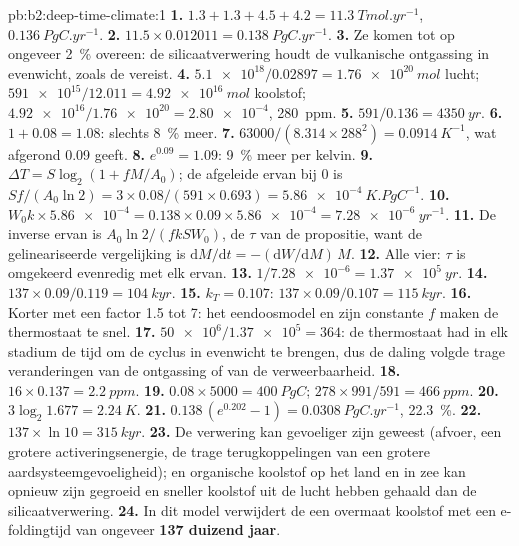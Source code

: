 \begin{solution}{pb:b2:deep-time-climate:1}
\textbf{1.} $1.3 + 1.3 + 4.5 + 4.2 = \qty{11.3}{Tmol.yr^{-1}}$, $\qty{0.136}{PgC.yr^{-1}}$.
\textbf{2.} $11.5\times0.012011 = \qty{0.138}{PgC.yr^{-1}}$.
\textbf{3.} Ze komen tot op ongeveer \qty{2}{\percent} overeen: de silicaatverwering houdt de vulkanische
ontgassing in evenwicht, zoals de  vereist.
\textbf{4.} $\num{5.1e18}/0.02897 = \qty{1.76e20}{mol}$ lucht; $\num{591e15}/12.011 =
\qty{4.92e16}{mol}$ koolstof; $\num{4.92e16}/\num{1.76e20} = \num{2.80e-4}$, \qty{280}{ppm}.
\textbf{5.} $591/0.136 = \qty{4350}{yr}$.
\textbf{6.} $1 + 0.08 = 1.08$: slechts \qty{8}{\percent} meer.
\textbf{7.} $63000/(8.314\times288^2) = \qty{0.0914}{K^{-1}}$, wat afgerond 0.09 geeft.
\textbf{8.} $e^{0.09} = 1.09$: \qty{9}{\percent} meer per kelvin.
\textbf{9.} $\Delta T = S\log_2(1 + fM/A_0)$; de afgeleide ervan bij 0 is $Sf/(A_0\ln2) =
3\times0.08/(591\times0.693) = \qty{5.86e-4}{K.PgC^{-1}}$.
\textbf{10.} $W_0k\times\num{5.86e-4} = 0.138\times0.09\times\num{5.86e-4} = \qty{7.28e-6}{yr^{-1}}$.
\textbf{11.} De inverse ervan is $A_0\ln2/(fkSW_0)$, de $\tau$ van de propositie, want de
gelineariseerde vergelijking is $\mathrm dM/\mathrm dt = -(\mathrm dW/\mathrm dM)\,M$.
\textbf{12.} Alle vier: $\tau$ is omgekeerd evenredig met elk ervan.
\textbf{13.} $1/\num{7.28e-6} = \qty{1.37e5}{yr}$.
\textbf{14.} $137\times0.09/0.119 = \qty{104}{kyr}$.
\textbf{15.} $k_T = 0.107$: $137\times0.09/0.107 = \qty{115}{kyr}$.
\textbf{16.} Korter met een factor 1.5 tot 7: het eendoosmodel en zijn constante $f$ maken de
thermostaat te snel.
\textbf{17.} $\num{50e6}/\num{1.37e5} = 364$: de thermostaat had in elk stadium de tijd om de cyclus in evenwicht te brengen,
dus de daling volgde trage veranderingen van de ontgassing of van de verweerbaarheid.
\textbf{18.} $16\times0.137 = \qty{2.2}{ppm}$.
\textbf{19.} $0.08\times5000 = \qty{400}{PgC}$; $278\times991/591 = \qty{466}{ppm}$.
\textbf{20.} $3\log_2 1.677 = \qty{2.24}{K}$.
\textbf{21.} $0.138\,(e^{0.202} - 1) = \qty{0.0308}{PgC.yr^{-1}}$, \qty{22.3}{\percent}.
\textbf{22.} $137\times\ln10 = \qty{315}{kyr}$.
\textbf{23.} De verwering kan gevoeliger zijn geweest (afvoer, een grotere activeringsenergie, de
trage terugkoppelingen van een grotere aardsysteemgevoeligheid); en organische koolstof op het land en in zee kan
opnieuw zijn gegroeid en sneller koolstof uit de lucht hebben gehaald dan de silicaatverwering.
\textbf{24.} In dit model verwijdert de  een overmaat koolstof met een
e-foldingtijd van ongeveer \textbf{\qty[text-series-to-math=true]{137}{} duizend jaar}.
\end{solution}
